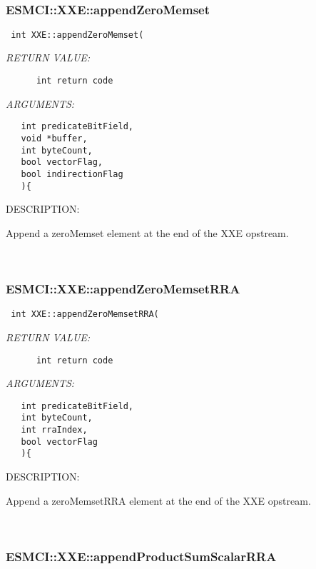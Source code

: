\mbox{}\hrulefill\
 
\subsubsection [ESMCI::XXE::appendZeroMemset] {ESMCI::XXE::appendZeroMemset}


  
\begin{verbatim} int XXE::appendZeroMemset(\end{verbatim}{\em RETURN VALUE:}
\begin{verbatim}      int return code\end{verbatim}{\em ARGUMENTS:}
\begin{verbatim}   int predicateBitField,
   void *buffer,
   int byteCount,
   bool vectorFlag,
   bool indirectionFlag
   ){\end{verbatim}
{\sf DESCRIPTION:\\ }


    Append a zeroMemset element at the end of the XXE opstream. 
 
\mbox{}\hrulefill\
 
\subsubsection [ESMCI::XXE::appendZeroMemsetRRA] {ESMCI::XXE::appendZeroMemsetRRA}


  
\begin{verbatim} int XXE::appendZeroMemsetRRA(\end{verbatim}{\em RETURN VALUE:}
\begin{verbatim}      int return code\end{verbatim}{\em ARGUMENTS:}
\begin{verbatim}   int predicateBitField,
   int byteCount,
   int rraIndex,
   bool vectorFlag
   ){\end{verbatim}
{\sf DESCRIPTION:\\ }


    Append a zeroMemsetRRA element at the end of the XXE opstream. 
 
\mbox{}\hrulefill\
 
\subsubsection [ESMCI::XXE::appendProductSumScalarRRA] {ESMCI::XXE::appendProductSumScalarRRA}


